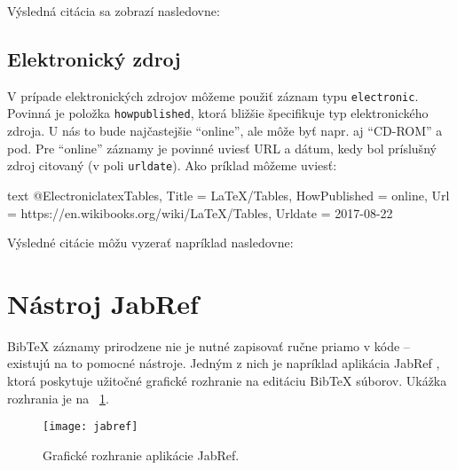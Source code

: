 Výsledná citácia sa zobrazí nasledovne:

\noindent[X] 

\subsection{Elektronický zdroj}

V prípade elektronických zdrojov môžeme použiť záznam typu \texttt{electronic}. Povinná je položka \texttt{howpublished}, ktorá bližšie špecifikuje typ elektronického zdroja. U nás to bude najčastejšie \enquote{online}, ale môže byť napr. aj \enquote{CD-ROM} a pod. Pre \enquote{online} záznamy je povinné uviesť URL a dátum, kedy bol príslušný zdroj citovaný (v poli \texttt{urldate}). Ako príklad môžeme uviesť:
\begin{inlinecode}{text}
@Electronic{latexTables,
  Title                    = {LaTeX/Tables},
  HowPublished             = {online},
  Url                      = {https://en.wikibooks.org/wiki/LaTeX/Tables},
  Urldate                  = {2017-08-22}
}
\end{inlinecode}

Výsledné citácie môžu vyzerať napríklad nasledovne:

\noindent[X] 

\noindent[X] 

\section{Nástroj JabRef}

BibTeX záznamy prirodzene nie je nutné zapisovať ručne priamo v kóde -- existujú na to pomocné nástroje. Jedným z nich je napríklad aplikácia JabRef \cite{jabref}, ktorá poskytuje užitočné grafické rozhranie na editáciu BibTeX súborov. Ukážka rozhrania je na \figurename~\ref{fig:jabref}.

\begin{figure}
\centering
\texttt{[image: jabref]}
\caption{Grafické rozhranie aplikácie JabRef.}
\label{fig:jabref}
\end{figure}

